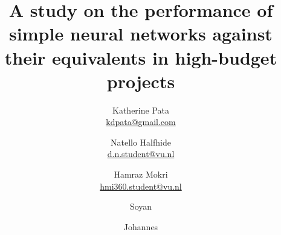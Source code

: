 \documentclass[11pt, a4paper]{article}
\begin{document}
\title{A study on the performance of simple neural networks against their equivalents in high-budget projects}
\author{
  Katherine Pata \\ \href{mailto:kdpata@gmail.com}{kdpata@gmail.com}
  \and Natello Halfhide \\ \href{mailto:d.n.student@vu.nl}{d.n.student@vu.nl}
  \and Hamraz Mokri \\ \href{mailto:hmi360.student@vu.nl}{hmi360.student@vu.nl}
  \and Soyan \\ \href{mailto:}{}
  \and Johannes \\ \href{mailto:}{}
}
\maketitle

\newpage

\tableofcontents

\newpage
\restoregeometry

\twocolumn










\newpage
\onecolumn
\appendix
\end{document}
